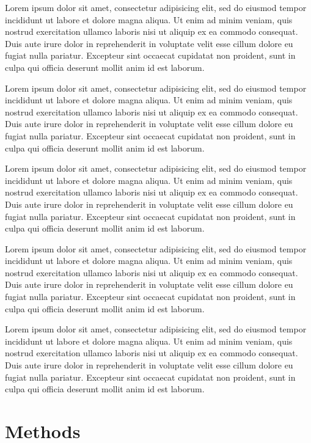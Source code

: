 \documentclass[10pt, twocolumn]{revtex4}    %
\begin{document}
Lorem ipsum dolor sit amet, consectetur adipisicing elit, sed do eiusmod tempor incididunt ut labore et dolore magna aliqua. Ut enim ad minim veniam, quis nostrud exercitation ullamco laboris nisi ut aliquip ex ea commodo consequat. Duis aute irure dolor in reprehenderit in voluptate velit esse cillum dolore eu fugiat nulla pariatur. Excepteur sint occaecat cupidatat non proident, sunt in culpa qui officia deserunt mollit anim id est laborum.


Lorem ipsum dolor sit amet, consectetur adipisicing elit, sed do eiusmod tempor incididunt ut labore et dolore magna aliqua. Ut enim ad minim veniam, quis nostrud exercitation ullamco laboris nisi ut aliquip ex ea commodo consequat. Duis aute irure dolor in reprehenderit in voluptate velit esse cillum dolore eu fugiat nulla pariatur. Excepteur sint occaecat cupidatat non proident, sunt in culpa qui officia deserunt mollit anim id est laborum.


Lorem ipsum dolor sit amet, consectetur adipisicing elit, sed do eiusmod tempor incididunt ut labore et dolore magna aliqua. Ut enim ad minim veniam, quis nostrud exercitation ullamco laboris nisi ut aliquip ex ea commodo consequat. Duis aute irure dolor in reprehenderit in voluptate velit esse cillum dolore eu fugiat nulla pariatur. Excepteur sint occaecat cupidatat non proident, sunt in culpa qui officia deserunt mollit anim id est laborum.

Lorem ipsum dolor sit amet, consectetur adipisicing elit, sed do eiusmod tempor incididunt ut labore et dolore magna aliqua. Ut enim ad minim veniam, quis nostrud exercitation ullamco laboris nisi ut aliquip ex ea commodo consequat. Duis aute irure dolor in reprehenderit in voluptate velit esse cillum dolore eu fugiat nulla pariatur. Excepteur sint occaecat cupidatat non proident, sunt in culpa qui officia deserunt mollit anim id est laborum.

Lorem ipsum dolor sit amet, consectetur adipisicing elit, sed do eiusmod tempor incididunt ut labore et dolore magna aliqua. Ut enim ad minim veniam, quis nostrud exercitation ullamco laboris nisi ut aliquip ex ea commodo consequat. Duis aute irure dolor in reprehenderit in voluptate velit esse cillum dolore eu fugiat nulla pariatur. Excepteur sint occaecat cupidatat non proident, sunt in culpa qui officia deserunt mollit anim id est laborum.
\section{Methods}
\end{document}
